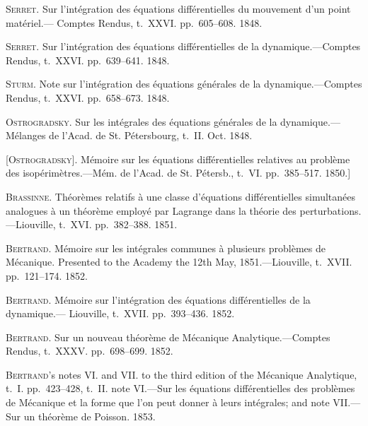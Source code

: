 \documentclass[11pt,a4paper]{book}
\begin{document}
\noindent\textsc{Serret}. Sur l'int\'egration des \'equations diff\'erentielles du mouvement d'un point mat\'eriel.---
Comptes Rendus, t.~XXVI. pp.~605--608. 1848.

\smallskip

\noindent\textsc{Serret}. Sur l'int\'egration des \'equations diff\'erentielles de la dynamique.---Comptes Rendus,
t.~XXVI. pp.~639--641. 1848.

\smallskip

\noindent\textsc{Sturm}. Note sur l'int\'egration des \'equations g\'en\'erales de la dynamique.---Comptes
Rendus, t.~XXVI. pp.~658--673. 1848.

\smallskip

\noindent\textsc{Ostrogradsky}. Sur les int\'egrales des \'equations g\'en\'erales de la dynamique.---M\'elanges
de l'Acad. de St. P\'etersbourg, t.~II. Oct. 1848.

\smallskip

\noindent\textsc{[Ostrogradsky]}. M\'emoire sur les \'equations diff\'erentielles relatives au probl\`eme des
isop\'erim\`etres.---M\'em. de l'Acad. de St. P\'etersb., t.~VI. pp.~385--517. 1850.]

\smallskip

\noindent\textsc{Brassinne}. Th\'eor\`emes relatifs \`a une classe d'\'equations diff\'erentielles simultan\'ees analogues
\`a un th\'eor\`eme employ\'e par Lagrange dans la th\'eorie des perturbations.---Liouville,
t.~XVI. pp.~382--388. 1851.

\smallskip

\noindent\textsc{Bertrand}. M\'emoire sur les int\'egrales communes \`a plusieurs probl\`emes de M\'ecanique.
Presented to the Academy the 12th May, 1851.---Liouville, t.~XVII. pp.~121--174.
1852.

\smallskip

\noindent\textsc{Bertrand}. M\'emoire sur l'int\'egration des \'equations diff\'erentielles de la dynamique.---
Liouville, t.~XVII. pp.~393--436. 1852.

\smallskip

\noindent\textsc{Bertrand}. Sur un nouveau th\'eor\`eme de M\'ecanique Analytique.---Comptes Rendus,
t.~XXXV. pp.~698--699. 1852.

\smallskip

\noindent\textsc{Bertrand}'s notes VI. and VII. to the third edition of the M\'ecanique Analytique,
t.~I. pp.~423--428, t.~II. note VI.---Sur les \'equations diff\'erentielles des probl\`emes de
M\'ecanique et la forme que l'on peut donner \`a leurs int\'egrales; and note VII.---
Sur un th\'eor\`eme de Poisson. 1853.
\end{document}

